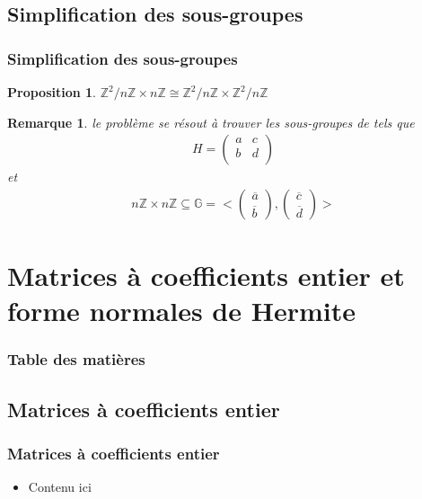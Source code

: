 \documentclass{beamer}
\newtheorem{rmk}{Remarque}
\newtheorem{prp}{Proposition}
\begin{document}
\subsection{Simplification des sous-groupes}
\begin{frame}
\frametitle{Simplification des sous-groupes}

\begin{prp}
    \center $\mathbb{Z}^2/n\mathbb{Z} \times n\mathbb{Z} \cong  \mathbb{Z}^{2}/n\mathbb{Z} \times \mathbb{Z}^{2}/n\mathbb{Z}$
\end{prp}

\begin{rmk}
    le problème se résout à trouver les sous-groupes  de  tels que
    \begin{align*}
        H = \begin{pmatrix}
            a & c \\
            b & d \\
        \end{pmatrix}
    \end{align*}
    \center et
    \begin{align*}
        n\mathbb{Z} \times n\mathbb{Z} \subseteq \mathbb{G} = < 
            \begin{pmatrix}
                \overline{a} \\
                \overline{b}
            \end{pmatrix}
            ,
            \begin{pmatrix}
                \overline{c} \\
                \overline{d}
            \end{pmatrix}
            >
    \end{align*}
\end{rmk}

\end{frame}

\section{Matrices à coefficients entier et forme normales de Hermite}
\begin{frame}
\frametitle{Table des matières}
\tableofcontents[currentsection]
\end{frame}

\subsection{Matrices à coefficients entier}
\begin{frame}
\frametitle{Matrices à coefficients entier}
\begin{itemize}
\item Contenu ici
\end{itemize}
\end{frame}
\end{document}
